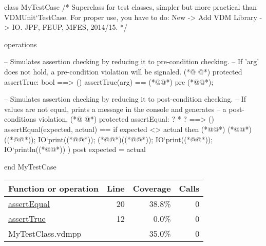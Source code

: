 \begin{vdmpp}[breaklines=true]
class MyTestCase
/*
  Superclass for test classes, simpler but more practical than VDMUnit`TestCase. 
  For proper use, you have to do: New -> Add VDM Library -> IO.
  JPF, FEUP, MFES, 2014/15.
*/

operations

 -- Simulates assertion checking by reducing it to pre-condition checking.
 -- If 'arg' does not hold, a pre-condition violation will be signaled.
(*@
\label{assertTrue:12}
@*)
 protected assertTrue: bool ==> ()
 assertTrue(arg) == 
  (*@@*) 
 pre (*@@*);
  
 -- Simulates assertion checking by reducing it to post-condition checking.
 -- If values are not equal, prints a message in the console and generates 
 -- a post-conditions violation.
(*@
\label{assertEqual:20}
@*)
 protected assertEqual: ? * ? ==> ()
 assertEqual(expected, actual) == 
  if expected <> actual then (*@\vdmnotcovered{(}@*)
     (*@@*)((*@@*));
     IO`print((*@@*)); 
     (*@@*)((*@@*));
     IO`print((*@@*));
     IO`println((*@@*))
  )
 post expected = actual
  
end MyTestCase
\end{vdmpp}
\bigskip
\begin{longtable}{|l|r|r|r|}
\hline
Function or operation & Line & Coverage & Calls \\
\hline
\hline
\hyperref[assertEqual:20]{assertEqual} & 20&38.8\% & 0 \\
\hline
\hyperref[assertTrue:12]{assertTrue} & 12&0.0\% & 0 \\
\hline
\hline
MyTestClass.vdmpp & & 35.0\% & 0 \\
\hline
\end{longtable}

